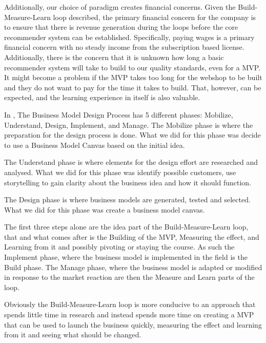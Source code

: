 Additionally, our choice of paradigm creates financial concerns. 
Given the Build-Measure-Learn loop described, the primary financial concern for the company is to ensure that there is revenue generation during the loops before the core recommender system can be established. 
Specifically, paying wages is a primary financial concern with no steady income from the subscription based license. 
Additionally, there is the concern that it is unknown how long a basic recommender system will take to build to our quality standards, even for a MVP.
It might become a problem if the MVP takes too long for the webshop to be built and they do not want to pay for the time it takes to build. That, however, can be expected, and the learning experience in itself is also valuable.

In \citet[pg. 241-261]{osterwalder2010business}, The Business Model Design Process has 5 different phases: Mobilize, Understand, Design, Implement, and Manage.
The Mobilize phase is where the preparation for the design process is done.
What we did for this phase was decide to use a Business Model Canvas based on the initial idea.

The Understand phase is where elements for the design effort are researched and analysed. 
What we did for this phase was identify possible customers, use storytelling to gain clarity about the business idea and how it should function.

The Design phase is where business models are generated, tested and selected.
What we did for this phase was create a business model canvas.

The first three steps alone are the idea part of the Build-Measure-Learn loop, that and what comes after is the Building of the MVP, Measuring the effect, and Learning from it and possibly pivoting or staying the course. 
As such the Implement phase, where the business model is implemented in the field is the Build phase.
The Manage phase, where the business model is adapted or modified in response to the market reaction are then the Measure and Learn parts of the loop.

Obviously the Build-Measure-Learn loop is more conducive to an approach that spends little time in research and instead spends more time on creating a MVP that can be used to launch the business quickly, measuring the effect and learning from it and seeing what should be changed.

%
